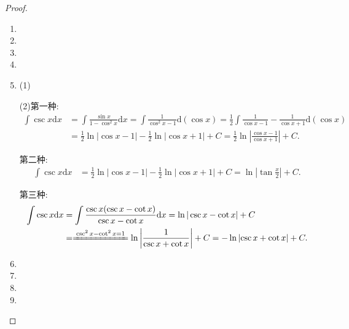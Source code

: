 \documentclass[../../main.tex]{subfiles}%
\begin{document}
\begin{proof}
\begin{enumerate}
\item 

\item 

\item 

\item 

\item (1)

(2)第一种:
\begin{align*}
\int \csc x \mathrm{d}x &= \int \frac{\sin x}{1 - \cos^2 x} \mathrm{d}x = \int \frac{1}{\cos^2 x - 1} \mathrm{d}(\cos x) = \frac{1}{2}
\int \frac{1}{\cos x - 1} - \frac{1}{\cos x + 1} \mathrm{d}(\cos x) \\
&= \frac{1}{2}\ln|\cos x - 1| - \frac{1}{2}\ln|\cos x + 1| + C=\frac{1}{2}\ln \left| \frac{\cos x-1}{\cos x+1} \right|+C.
\end{align*}

第二种:
\begin{align*}
\int \csc x \mathrm{d}x &= \frac{1}{2}\ln|\cos x - 1| - \frac{1}{2}\ln|\cos x + 1| + C = \ln|\tan \frac{x}{2}| + C.
\end{align*}

第三种:
\begin{align*}
\int \csc x \mathrm{d}x &= \int \frac{\csc x(\csc x - \cot x)}{\csc x - \cot x} \mathrm{d}x = \ln|\csc x - \cot x| + C\\
&=\xlongequal{\csc ^2x-\cot ^2x=1}\ln \left| \frac{1}{\csc x+\cot x} \right|+C
=-\ln \left| \csc x+\cot x \right|+C.
\end{align*}

\item 

\item 

\item 

\item 
\end{enumerate}
\end{proof}
\end{document}
